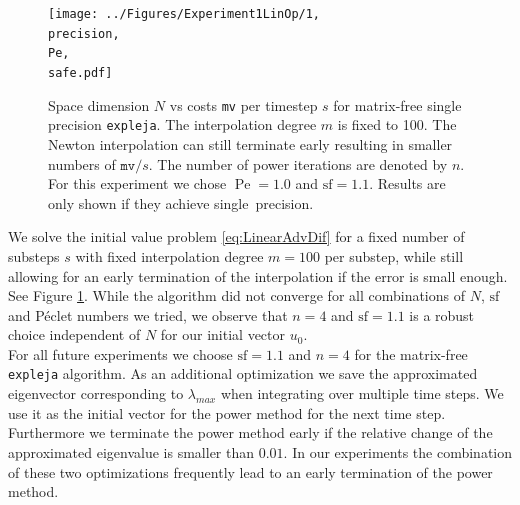 \documentclass{scrartcl}
\begin{document}
	\begin{figure}[h]
		\newcommand{\Pe}{Pe=1.0}
		\newcommand{\precision}{single}
		\newcommand{\safe}{sf=1.1}
		
		\centering
		\texttt{[image: ../Figures/Experiment1LinOp/1, \\precision, \\Pe, \\safe.pdf]}
		\caption{Space dimension $N$ vs costs \texttt{mv} per timestep $s$ for matrix-free single precision \texttt{expleja}. The interpolation degree $m$ is fixed to 100. The Newton interpolation can still terminate early resulting in smaller numbers of $\texttt{mv}/s$. The number of power iterations are denoted by $n$. For this experiment we chose $\operatorname{Pe}=1.0$ and $\text{sf}=1.1$. Results are only shown if they achieve \precision\ precision.} \label{fig:Poweriterations}
	\end{figure}
	We solve the initial value problem \ref{eq:LinearAdvDif} for a fixed number of substeps $s$ with fixed interpolation degree $m=100$ per substep, while still allowing for an early termination of the interpolation if the error is small enough. See Figure \ref{fig:Poweriterations}. While the algorithm did not converge for all combinations of $N$, $\text{sf}$ and P\'eclet numbers we tried, we observe that $n=4$ and $\text{sf}=1.1$ is a robust choice independent of $N$ for our initial vector $u_0$.\\
	For all future experiments we choose $\text{sf}=1.1$ and $n=4$ for the matrix-free \texttt{expleja} algorithm. As an additional optimization we save the approximated eigenvector corresponding to $\lambda_{max}$ when integrating over multiple time steps. We use it as the initial vector for the power method for the next time step. Furthermore we terminate the power method early if the relative change of the approximated eigenvalue is smaller than $0.01$. In our experiments the combination of these two optimizations frequently lead to an early termination of the power method. 
\end{document}
